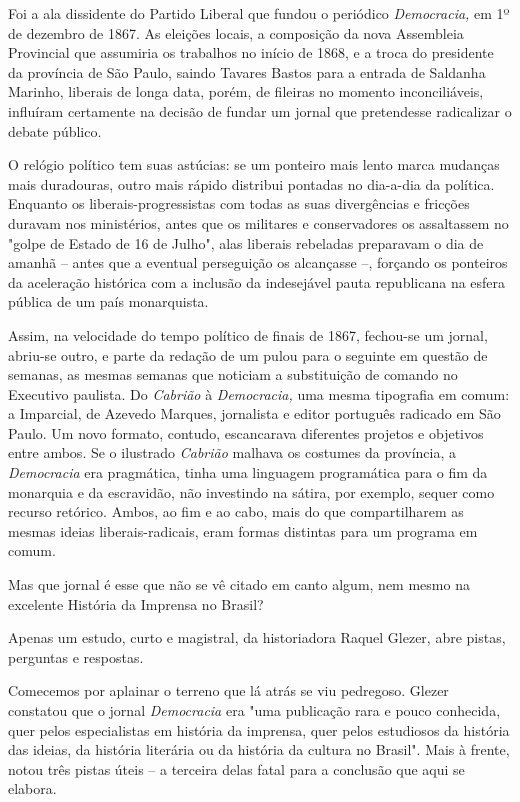 Foi a ala dissidente do Partido Liberal que fundou o periódico
\emph{Democracia,} em 1º de dezembro de 1867. As eleições locais, a
composição da nova Assembleia Provincial que assumiria os trabalhos no
início de 1868, e a troca do presidente da província de São Paulo,
saindo Tavares Bastos para a entrada de Saldanha Marinho, liberais de
longa data, porém, de fileiras no momento inconciliáveis, influíram
certamente na decisão de fundar um jornal que pretendesse radicalizar o
debate público.

O relógio político tem suas astúcias: se um ponteiro mais lento marca
mudanças mais duradouras, outro mais rápido distribui pontadas no
dia-a-dia da política. Enquanto os liberais-progressistas com todas as
suas divergências e fricções duravam nos ministérios, antes que os
militares e conservadores os assaltassem no "golpe de Estado de 16 de
Julho", alas liberais rebeladas preparavam o dia de amanhã -- antes que
a eventual perseguição os alcançasse --, forçando os ponteiros da
aceleração histórica com a inclusão da indesejável pauta republicana na
esfera pública de um país monarquista.

Assim, na velocidade do tempo político de finais de 1867, fechou-se um
jornal, abriu-se outro, e parte da redação de um pulou para o seguinte
em questão de semanas, as mesmas semanas que noticiam a substituição de
comando no Executivo paulista. Do \emph{Cabrião} à \emph{Democracia,}
uma mesma tipografia em comum: a Imparcial, de Azevedo Marques,
jornalista e editor português radicado em São Paulo. Um novo formato,
contudo, escancarava diferentes projetos e objetivos entre ambos. Se o
ilustrado \emph{Cabrião} malhava os costumes da província, a
\emph{Democracia} era pragmática, tinha uma linguagem programática para
o fim da monarquia e da escravidão, não investindo na sátira, por
exemplo, sequer como recurso retórico. Ambos, ao fim e ao cabo, mais do
que compartilharem as mesmas ideias liberais-radicais, eram formas
distintas para um programa em comum.

Mas que jornal é esse que não se vê citado em canto algum, nem mesmo na
excelente História da Imprensa no Brasil?

Apenas um estudo, curto e magistral, da historiadora Raquel Glezer, abre
pistas, perguntas e respostas.

Comecemos por aplainar o terreno que lá atrás se viu pedregoso. Glezer
constatou que o jornal \emph{Democracia} era "uma publicação rara e
pouco conhecida, quer pelos especialistas em história da imprensa, quer
pelos estudiosos da história das ideias, da história literária ou da
história da cultura no Brasil". Mais à frente, notou três pistas úteis
-- a terceira delas fatal para a conclusão que aqui se elabora.

